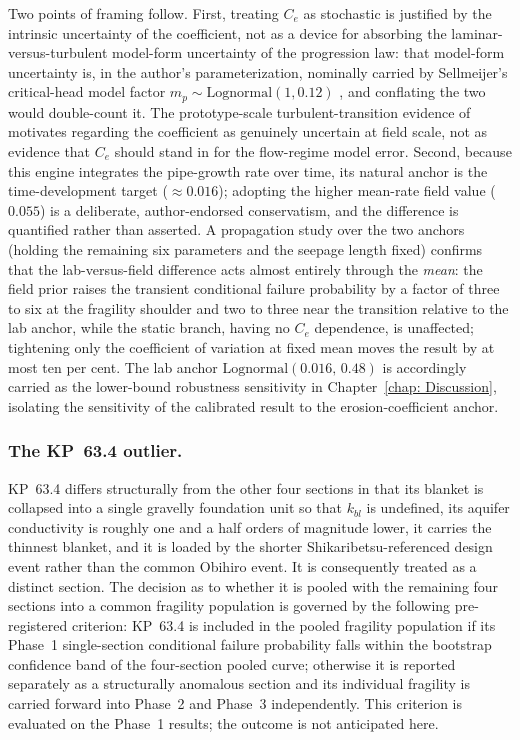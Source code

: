 Two points of framing follow. First, treating $C_e$ as stochastic is justified by the intrinsic uncertainty of the coefficient, not as a device for absorbing the laminar-versus-turbulent model-form uncertainty of the progression law: that model-form uncertainty is, in the author's parameterization, nominally carried by Sellmeijer's critical-head model factor $m_p \sim \mathrm{Lognormal}(1, 0.12)$ \parencite{pol_sie_2024}, and conflating the two would double-count it. The prototype-scale turbulent-transition evidence of \textcite{Okamura2022} motivates regarding the coefficient as genuinely uncertain at field scale, not as evidence that $C_e$ should stand in for the flow-regime model error. Second, because this engine integrates the pipe-growth rate over time, its natural anchor is the time-development target ($\approx 0.016$); adopting the higher mean-rate field value ($0.055$) is a deliberate, author-endorsed conservatism, and the difference is quantified rather than asserted. A propagation study over the two anchors (holding the remaining six parameters and the seepage length fixed) confirms that the lab-versus-field difference acts almost entirely through the \emph{mean}: the field prior raises the transient conditional failure probability by a factor of three to six at the fragility shoulder and two to three near the transition relative to the lab anchor, while the static branch, having no $C_e$ dependence, is unaffected; tightening only the coefficient of variation at fixed mean moves the result by at most ten per cent. The lab anchor $\mathrm{Lognormal}(0.016,\,0.48)$ is accordingly carried as the lower-bound robustness sensitivity in Chapter~\ref{chap: Discussion}, isolating the sensitivity of the calibrated result to the erosion-coefficient anchor.

\subsubsection*{The KP~63.4 outlier.}
KP~63.4 differs structurally from the other four sections in that its blanket is collapsed into a single gravelly foundation unit so that $k_{bl}$ is undefined, its aquifer conductivity is roughly one and a half orders of magnitude lower, it carries the thinnest blanket, and it is loaded by the shorter Shikaribetsu-referenced design event rather than the common Obihiro event. It is consequently treated as a distinct section. The decision as to whether it is pooled with the remaining four sections into a common fragility population is governed by the following pre-registered criterion: KP~63.4 is included in the pooled fragility population if its Phase~1 single-section conditional failure probability falls within the bootstrap confidence band of the four-section pooled curve; otherwise it is reported separately as a structurally anomalous section and its individual fragility is carried forward into Phase~2 and Phase~3 independently. This criterion is evaluated on the Phase~1 results; the outcome is not anticipated here.

